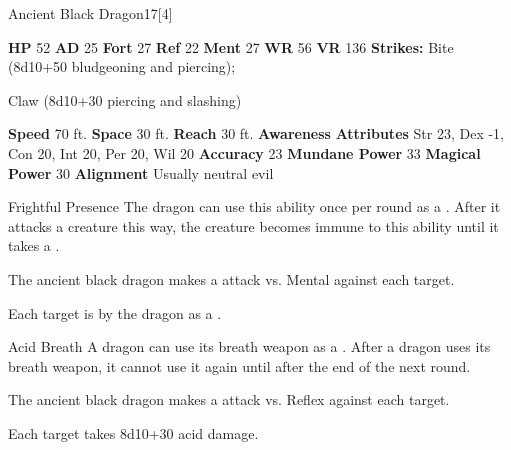   \begin{monsubsection}{Ancient Black Dragon}{17}[4]
    \vspace{-1em}\vspace{-1em}
    \vspace{0em}

    
    

    \begin{spellcontent}
      \begin{spelltargetinginfo}
        \pari \textbf{HP} 52 \monsep
          \textbf{AD} 25 \monsep
          \textbf{Fort} 27 \monsep
          \textbf{Ref} 22 \monsep
          \textbf{Ment} 27
        \pari \textbf{WR} 56 \monsep
        \textbf{VR} 136
        \pari \textbf{Strikes:}
            Bite  (8d10+50 bludgeoning and piercing);
\par Claw  (8d10+30 piercing and slashing)
      \end{spelltargetinginfo}
    \end{spellcontent}
    \begin{monsterfooter}
      \pari \textbf{Speed} 70 ft. \monsep
        \textbf{Space} 30 ft. \monsep
        \textbf{Reach} 30 ft.
      \pari \textbf{Awareness} 
      \pari \textbf{Attributes}
        Str 23, Dex -1,
        Con 20, Int 20,
        Per 20, Wil 20
      \pari \textbf{Accuracy} 23 \monsep
        \textbf{Mundane Power} 33 \monsep
      \textbf{Magical Power} 30
      \pari \textbf{Alignment} Usually neutral evil
    \end{monsterfooter}
  \end{monsubsection}
  \begin{freeability}{Frightful Presence}
      The dragon can use this ability once per round as a .
      After it attacks a creature this way, the creature becomes immune to this ability until it takes a .
      \par The ancient black dragon makes a  attack
        vs. Mental against each target.
    
    \hit Each target is  by the dragon as a .
    \end{freeability}
  

    \begin{freeability}{Acid Breath}
      A dragon can use its breath weapon as a .
      After a dragon uses its breath weapon, it cannot use it again until after the end of the next round.
      \par The ancient black dragon makes a  attack
        vs. Reflex against each target.
    
    \hit Each target takes 8d10+30 acid damage.
    \end{freeability}
  
